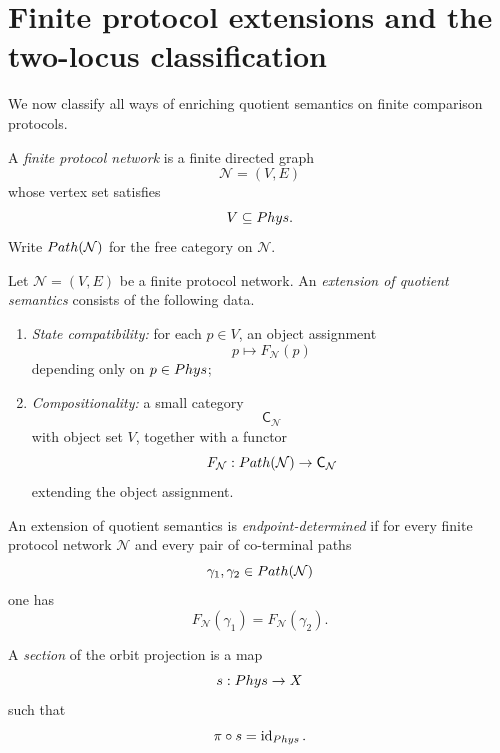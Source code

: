 \section{Finite protocol extensions and the two-locus classification}
\label{sec:two-locus-classification}
We now classify all ways of enriching quotient semantics on finite
comparison protocols.
\begin{definition}
	A \emph{finite protocol network} is a finite directed graph
	\[
		\mathcal N=(V,E)
	\]
	whose vertex set satisfies
	\[
		V\subseteq Phys.
	\]
	Write \(Path(\mathcal N)\) for the free category on \(\mathcal N\).
\end{definition}
\begin{definition}
	\label{def:extension}
	Let \(\mathcal N=(V,E)\) be a finite protocol network. An
	\emph{extension of quotient semantics} consists of the following data.
	\begin{enumerate}[label=\textup{(\roman*)}]
		\item \emph{State compatibility:} for each \(p\in V\), an object
		      assignment
		      \[
			      p\longmapsto F_{\mathcal N}(p)
		      \]
		      depending only on \(p\in Phys\);
		\item \emph{Compositionality:} a small category
		      \[
			      \mathsf C_{\mathcal N}
		      \]
		      with object set \(V\), together with a functor
		      \[
			      F_{\mathcal N}:Path(\mathcal N)\to\mathsf C_{\mathcal N}
		      \]
		      extending the object assignment.
	\end{enumerate}
\end{definition}
\begin{definition}
	An extension of quotient semantics is \emph{endpoint-determined} if for
	every finite protocol network \(\mathcal N\) and every pair of
	co-terminal paths
	\[
		\gamma_1,\gamma_2\in Path(\mathcal N)
	\]
	one has
	\[
		F_{\mathcal N}(\gamma_1)=F_{\mathcal N}(\gamma_2).
	\]
\end{definition}
\begin{definition}[Section]
	A \emph{section} of the orbit projection is a map
	\[
		s:Phys\to X
	\]
	such that
	\[
		\pi\circ s=\operatorname{id}_{Phys}.
	\]
\end{definition}
